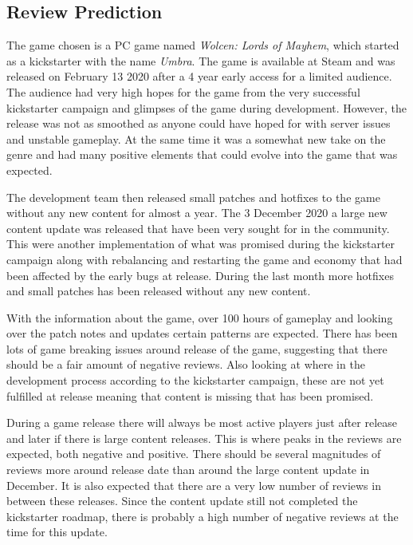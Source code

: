 \subsection{Review Prediction}
\label{sec:review-prediction}


The game chosen is a PC game named \emph{Wolcen: Lords of Mayhem}, which started as a kickstarter with the name \emph{Umbra}. \cite{kickstarter} 
The game is available at Steam \cite{wolcen} and was released on February 13 2020 after a 4 year early access for a limited audience. 
The audience had very high hopes for the game from the very successful kickstarter campaign and glimpses of the game during development. 
However, the release was not as smoothed as anyone could have hoped for with server issues and unstable gameplay. 
At the same time it was a somewhat new take on the genre and had many positive elements that could evolve into the game that was expected. 


The development team then released small patches and hotfixes to the game without any new content for almost a year. 
The 3 December 2020 a large new content update was released that have been very sought for in the community. 
This were another implementation of what was promised during the kickstarter campaign along with rebalancing and restarting the game and economy that had been affected by the early bugs at release. 
During the last month more hotfixes and small patches has been released without any new content.


With the information about the game, over 100 hours of gameplay and looking over the patch notes and updates certain patterns are expected. 
There has been lots of game breaking issues around release of the game, suggesting that there should be a fair amount of negative reviews. 
Also looking at where in the development process according to the kickstarter campaign, these are not yet fulfilled at release meaning that content is missing that has been promised. 


During a game release there will always be most active players just after release and later if there is large content releases. 
This is where peaks in the reviews are expected, both negative and positive. 
There should be several magnitudes of reviews more around release date than around the large content update in December. 
It is also expected that there are a very low number of reviews in between these releases. 
Since the content update still not completed the kickstarter roadmap, there is probably a high number of negative reviews at the time for this update.